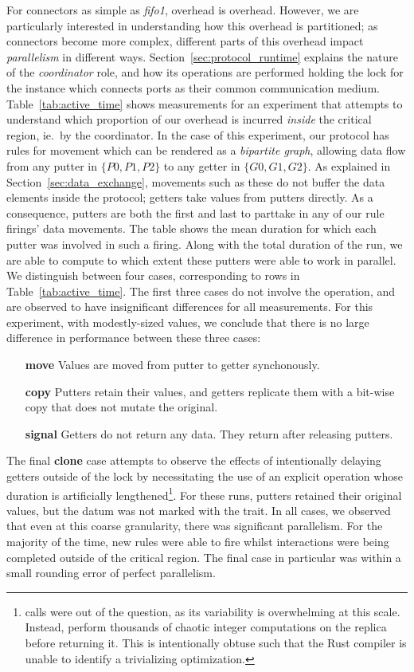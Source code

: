 For connectors as simple as \textit{fifo1}, overhead is overhead. However, we are particularly interested in understanding how this overhead is partitioned; as connectors become more complex, different parts of this overhead impact \textit{parallelism} in different ways. Section~\ref{sec:protocol_runtime} explains the nature of the \textit{coordinator} role, and how its operations are performed holding the lock for the  instance which connects ports as their common communication medium. Table~\ref{tab:active_time} shows measurements for an experiment that attempts to understand which proportion of our overhead is incurred \textit{inside} the critical region, ie.\ by the coordinator. In the case of this experiment, our protocol has rules for movement which can be rendered as a \textit{bipartite graph}, allowing data flow from any putter in $\{P0, P1, P2\}$ to any getter in $\{G0, G1, G2\}$. As explained in Section~\ref{sec:data_exchange}, movements such as these do not buffer the data elements inside the protocol; getters take values from putters directly. As a consequence, putters are both the first and last to parttake in any of our rule firings' data movements. The table shows the mean duration for which each putter was involved in such a firing. Along with the total duration of the run, we are able to compute to which extent these putters were able to work in parallel. We distinguish between four cases, corresponding to rows in Table~\ref{tab:active_time}. The first three cases do not involve the  operation, and are observed to have insignificant differences for all measurements. For this experiment, with modestly-sized values, we conclude that there is no large difference in performance between these three cases:
\begin{enumerate}
	\item [\textbf{move}] Values are moved from putter to getter synchonously.
	\item [\textbf{copy}] Putters retain their values, and getters replicate them with a bit-wise copy that does not mutate the original.
	\item [\textbf{signal}] Getters do not return any data. They return after releasing putters.
\end{enumerate}

The final \textbf{clone} case attempts to observe the effects of intentionally delaying getters outside of the lock by necessitating the use of an explicit  operation whose duration is artificially lengthened\footnote{ calls were out of the question, as its variability is overwhelming at this scale. Instead,  perform thousands of chaotic integer computations on the replica before returning it. This is intentionally obtuse such that the Rust compiler is unable to identify a trivializing optimization.}. For these runs, putters retained their original values, but the datum was not marked with the  trait. In all cases, we observed that even at this coarse granularity, there was significant parallelism. For the majority of the time, new rules were able to fire whilst interactions were being completed outside of the critical region. The final case in particular was within a small rounding error of perfect parallelism.

